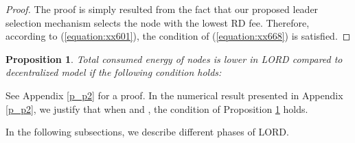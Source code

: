 \documentclass[journal,12pt, onecolumn]{IEEEtran}
\newtheorem{pr}{Proposition}
\begin{document}
\begin{proof}
The proof is simply resulted from the fact that our proposed leader selection mechanism selects the node with the lowest RD fee. Therefore, according to (\ref{equation:xx601}), the condition of (\ref{equation:xx668}) is satisfied. 
\end{proof}

\begin{pr}\label{energy_saving}
Total consumed energy of nodes is lower in LORD compared to decentralized model if the following condition holds:
\vspace{-2mm}

\end{pr}
See Appendix \ref{p_p2} for a proof. In the numerical result presented in Appendix \ref{p_p2}, we justify that when  and , the condition of Proposition \ref{energy_saving} holds. 

In the following subsections, we describe different phases of LORD.
\end{document}
